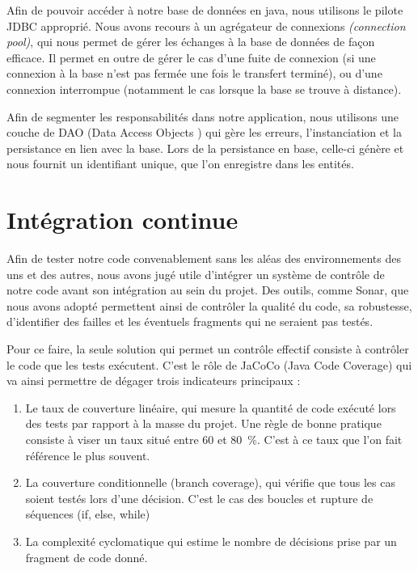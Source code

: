 \documentclass[a4paper,french,final]{memoir}
\begin{document}
Afin de pouvoir accéder à notre base de données en java, nous utilisons le pilote JDBC approprié. Nous avons recours à un agrégateur de connexions \emph{(connection pool)}, qui nous permet de gérer les échanges à la base de données de façon efficace. Il permet en outre de gérer le cas d'une fuite de connexion (si une connexion à la base n'est pas fermée une fois le transfert terminé), ou d'une connexion interrompue (notamment le cas lorsque la base se trouve à distance). 

Afin de segmenter les responsabilités dans notre application, nous utilisons une couche de DAO (Data Access Objects ) qui gère les erreurs, l'instanciation et la persistance en lien avec la base. Lors de la persistance en base, celle-ci génère et nous fournit un identifiant unique, que l'on enregistre dans les entités. 





\section {Intégration continue}

Afin de tester notre code convenablement sans les aléas des environnements des uns et des autres, nous avons jugé utile d'intégrer un système de contrôle de notre code avant son intégration au sein du projet. Des outils, comme Sonar, que nous avons adopté permettent ainsi de contrôler la qualité du code, sa robustesse, d'identifier des failles et les éventuels fragments qui ne seraient pas testés. 

Pour ce faire, la seule solution qui permet un contrôle effectif consiste à contrôler le code que les tests exécutent. C'est le rôle de JaCoCo (Java Code Coverage) qui va ainsi permettre de dégager trois indicateurs principaux : 

\begin{enumerate}
\item Le taux de couverture linéaire, qui mesure la quantité de code  exécuté lors des tests par rapport à la masse du projet. Une règle de bonne pratique consiste à viser un taux situé entre 60 et 80~\%. C'est à ce taux que l'on fait référence le plus souvent. 
\item La couverture conditionnelle (branch coverage), qui vérifie que tous les cas soient testés lors d'une décision. C'est le cas des boucles et rupture de séquences (if, else, while)
\item La complexité cyclomatique qui estime le nombre de décisions prise par un fragment de code donné. 
\end{enumerate}
\end{document}
